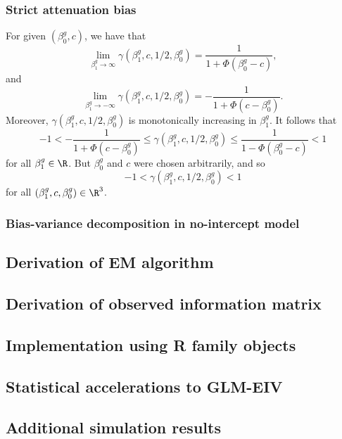 \documentclass[12pt]{article}
\begin{document}
\subsubsection{Strict attenuation bias}

For given $(\beta^g_0, c)$, we have that
$$ \lim_{\beta^g_1 \to \infty} \gamma(\beta^g_1, c, 1/2, \beta^g_0) = \frac{1}{1 + \Phi(\beta^g_0 - c)},$$ and $$\lim_{\beta^g_1 \to -\infty} \gamma(\beta^g_1, c, 1/2, \beta^g_0) = -\frac{1}{1 + \Phi(c - \beta^g_0)}.$$
Moreover, $\gamma(\beta^g_1, c, 1/2, \beta^g_0)$ is monotonically increasing in $\beta^g_1$. It follows that 
$$-1 < -\frac{1}{1 + \Phi(c - \beta^g_0)} \leq \gamma(\beta^g_1, c, 1/2, \beta^g_0) \leq \frac{1}{1 - \Phi(\beta^g_0 - c)} < 1$$ for all $\beta^g_1 \in \R$. But $\beta^g_0$ and $c$ were chosen arbitrarily, and so
$$-1 < \gamma(\beta^g_1, c, 1/2, \beta^g_0) < 1$$ for all $(\beta^g_1, c, \beta^g_0) \in \R^3$.
  
\subsubsection{Bias-variance decomposition in no-intercept model} 
 
 
 
\subsection{Derivation of EM algorithm}

\subsection{Derivation of observed information matrix}

\subsection{Implementation using R family objects}

\subsection{Statistical accelerations to GLM-EIV}

\subsection{Additional simulation results}



\newpage

\end{document}
